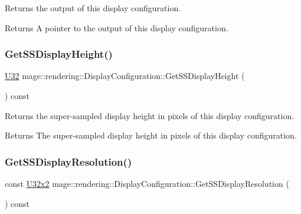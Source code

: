 Returns the output of this display configuration.

\begin{DoxyReturn}{Returns}
A pointer to the output of this display configuration. 
\end{DoxyReturn}
\mbox{\label{classmage_1_1rendering_1_1_display_configuration_a7bbb45919b9cd4ae20cc9f4cac8a7069}} 
\subsubsection{\texorpdfstring{Get\+S\+S\+Display\+Height()}{GetSSDisplayHeight()}}
{\footnotesize\ttfamily \mbox{\hyperlink{namespacemage_a41c104c036fba3756a74e19f793eeaa1}{U32}} mage\+::rendering\+::\+Display\+Configuration\+::\+Get\+S\+S\+Display\+Height (\begin{DoxyParamCaption}{ }\end{DoxyParamCaption}) const\hspace{0.3cm}{\ttfamily [noexcept]}}

Returns the super-\/sampled display height in pixels of this display configuration.

\begin{DoxyReturn}{Returns}
The super-\/sampled display height in pixels of this display configuration. 
\end{DoxyReturn}
\mbox{\label{classmage_1_1rendering_1_1_display_configuration_a1e55018800cb0c229571274c4f6c222c}} 
\subsubsection{\texorpdfstring{Get\+S\+S\+Display\+Resolution()}{GetSSDisplayResolution()}}
{\footnotesize\ttfamily const \mbox{\hyperlink{namespacemage_a31f2bb52b5080e706e1c13de07c0a249}{U32x2}} mage\+::rendering\+::\+Display\+Configuration\+::\+Get\+S\+S\+Display\+Resolution (\begin{DoxyParamCaption}{ }\end{DoxyParamCaption}) const\hspace{0.3cm}{\ttfamily [noexcept]}}


